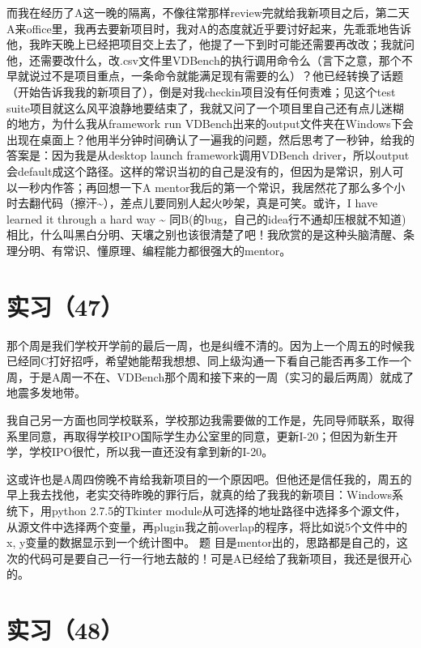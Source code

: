 \documentclass[12pt]{book}
\begin{document}
而我在经历了A这一晚的隔离，不像往常那样review完就给我新项目之后，第二天A来office里，我再去要新项目时，我对A的态度就近乎要讨好起来，先乖乖地告诉他，我昨天晚上已经把项目交上去了，他提了一下到时可能还需要再改改；我就问他，还需要改什么，改.csv文件里VDBench的执行调用命令么（言下之意，那个不早就说过不是项目重点，一条命令就能满足现有需要的么）？他已经转换了话题（开始告诉我我的新项目了），倒是对我checkin项目没有任何责难；见这个test suite项目就这么风平浪静地要结束了，我就又问了一个项目里自己还有点儿迷糊的地方，为什么我从framework run VDBench出来的output文件夹在Windows下会出现在桌面上？他用半分钟时间确认了一遍我的问题，然后思考了一秒钟，给我的答案是：因为我是从desktop launch framework调用VDBench driver，所以output会default成这个路径。这样的常识当初的自己是没有的，但因为是常识，别人可以一秒内作答；再回想一下A mentor我后的第一个常识，我居然花了那么多个小时去翻代码（擦汗\textasciitilde{}），差点儿要同别人起火吵架，真是可笑。或许，I have learned it through a hard way \textasciitilde{} 同B(的bug，自己的idea行不通却压根就不知道)相比，什么叫黑白分明、天壤之别也该很清楚了吧！我欣赏的是这种头脑清醒、条理分明、有常识、懂原理、编程能力都很强大的mentor。


\section{实习（47）}
\label{sec-5-50}

那个周是我们学校开学前的最后一周，也是纠缠不清的。因为上一个周五的时候我已经同C打好招呼，希望她能帮我想想、同上级沟通一下看自己能否再多工作一个周，于是A周一不在、VDBench那个周和接下来的一周（实习的最后两周）就成了地震多发地带。 

我自己另一方面也同学校联系，学校那边我需要做的工作是，先同导师联系，取得系里同意，再取得学校IPO国际学生办公室里的同意，更新I-20；但因为新生开学，学校IPO很忙，所以我一直还没有拿到新的I-20。

这或许也是A周四傍晚不肯给我新项目的一个原因吧。但他还是信任我的，周五的早上我去找他，老实交待昨晚的罪行后，就真的给了我我的新项目：Windows系统下，用python 2.7.5的Tkinter module从可选择的地址路径中选择多个源文件，从源文件中选择两个变量，再plugin我之前overlap的程序，将比如说5个文件中的x, y变量的数据显示到一个统计图中。 题 目是mentor出的，思路都是自己的，这次的代码可是要自己一行一行地去敲的！可是A已经给了我新项目，我还是很开心的。 


\section{实习（48）}
\label{sec-5-51}
\end{document}
